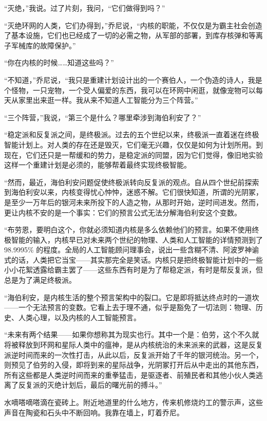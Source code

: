 \documentclass[AutoFakeBold=true]{book}
\begin{document}
``灭绝，''我说。过了片刻，我问，``它们做得到吗？''

``灭绝环网的人类，它们办得到，''乔尼说，``内核的职能，不仅仅是为霸主社会创造了基本设施，它们也已经成了一切的必需之物，从军部的部署，到库存核弹和等离子军械库的故障保护。''

``你在内核的时候……知道这些吗？''

``不知道，''乔尼说，``我只是重建计划设计出的一个赛伯人，一个伪造的诗人，我是个怪物，一只宠物，一个受人偏爱的东西，我可以在环网中闲逛，就像宠物可以每天从家里出来逛一样。我从来不知道人工智能分为三个阵营。''

``三个阵营，''我说，``第三个是什么？哪里牵涉到海伯利安了？''

``稳定派和反复派之间，是终极派。过去的五个世纪以来，终极派一直着迷在终极智能计划上。对人类的存在还是毁灭，它们毫无兴趣，仅仅是如何为计划所用。到现在，它们还只是一帮缓和的势力，是稳定派的同盟，因为它们觉得，像旧地实验这样一个重建计划是必须的，能够帮着最终实现终极智能。

``然而，最近，海伯利安问题促使终极派转向反复派的观点。自从四个世纪前探索到海伯利安以来，内核变得忧心忡忡，迷惑不解。它们很快知道，所谓的光阴冢，是至少一万年后的银河未来所投下的人造之物，从那时开始，逆时间进发。然而，更让内核不安的是一个事实：它们的预言公式无法分解海伯利安这个变数。

``布劳恩，要明白这个，你就必须知道内核是多么依赖他们的预言。如果不使用终极智能的输入，内核早已对未来两个世纪的物理、人类和人工智能的详情预测到了 98.9995\% 的程度。全局的人工智能顾问理事会，说出一些含糊不清、阿波罗神谕式的话，人类把它当宝——其实那完全是笑话。内核只是把终极智能计划中的一些小小花絮透露给霸主罢了——这些东西有时是为了帮稳定派，有时是帮反复派，但总是为了满足终极派。

``海伯利安，是内核生活的整个预言架构中的裂口。它是即将抵达终点时的一道坎——一个无法预言的变数。它看上去于理不通，似乎是豁免了一切法则：物理、历史、人类心理，以及内核的人工智能预言。

``未来有两个结果——如果你想称其为现实也行。其中一个是：伯劳，这个不久就将被释放到环网和星际人类中的瘟神，是从内核统治的未来派来的武器，这是反复派逆时间而来的一次性打击，从此以后，反复派开始了千年的银河统治。另一个，则预见了伯劳的入侵，即将到来的星际战争，光阴冢打开后从中走出的其他东西，所有这些都是人类逆时间而来的重拳猛击，是驱逐者、前殖民者和其他小伙人类逃离了反复派的灭绝计划后，最后的曙光前的搏斗。''

\vspace*{1em}

水嘀嗒嘀嗒滴在瓷砖上。附近地道里的什么地方，传来机修烧灼工的警示声，这些声音在陶瓷和石头中不断回响。我靠在墙上，盯着乔尼。
\end{document}
